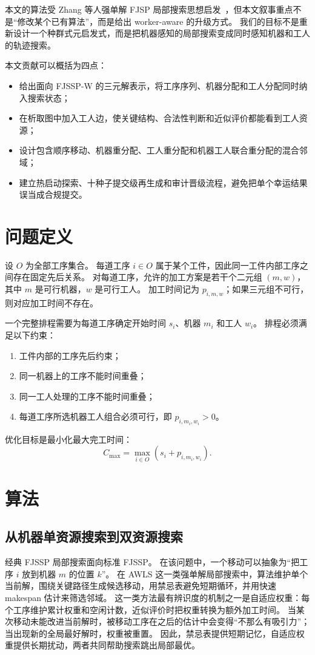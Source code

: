 \documentclass[UTF8,a4paper,zihao=-4]{ctexart}
\begin{document}
本文的算法受 Zhang 等人强单解 FJSP 局部搜索思想启发~\cite{zhang2024awls}，但本文叙事重点不是“修改某个已有算法”，而是给出 worker-aware 的升级方式。
我们的目标不是重新设计一个种群式元启发式，而是把机器感知的局部搜索变成同时感知机器和工人的轨迹搜索。

本文贡献可以概括为四点：
\begin{itemize}
  \item 给出面向 FJSSP-W 的三元解表示，将工序序列、机器分配和工人分配同时纳入搜索状态；
  \item 在析取图中加入工人边，使关键结构、合法性判断和近似评价都能看到工人资源；
  \item 设计包含顺序移动、机器重分配、工人重分配和机器工人联合重分配的混合邻域；
  \item 建立热启动探索、十种子提交级再生成和审计晋级流程，避免把单个幸运结果误当成合规提交。
\end{itemize}

\section{问题定义}
设 $O$ 为全部工序集合。
每道工序 $i\in O$ 属于某个工件，因此同一工件内部工序之间存在固定先后关系。
对每道工序，允许的加工方案是若干个二元组 $(m,w)$，其中 $m$ 是可行机器，$w$ 是可行工人。
加工时间记为 $p_{i,m,w}$；如果三元组不可行，则对应加工时间不存在。

一个完整排程需要为每道工序确定开始时间 $s_i$、机器 $m_i$ 和工人 $w_i$。
排程必须满足以下约束：
\begin{enumerate}
  \item 工件内部的工序先后约束；
  \item 同一机器上的工序不能时间重叠；
  \item 同一工人处理的工序不能时间重叠；
  \item 每道工序所选机器工人组合必须可行，即 $p_{i,m_i,w_i}>0$。
\end{enumerate}
优化目标是最小化最大完工时间：
\[
  C_{\max}=\max_{i\in O}\left(s_i+p_{i,m_i,w_i}\right).
\]

\section{算法}
\subsection{从机器单资源搜索到双资源搜索}
经典 FJSSP 局部搜索面向标准 FJSSP。
在该问题中，一个移动可以抽象为“把工序 $i$ 放到机器 $m$ 的位置 $k$”。
在 AWLS 这一类强单解局部搜索中，算法维护单个当前解，围绕关键路径生成候选移动，用禁忌表避免短期循环，并用快速 makespan 估计来筛选邻域。
这一类方法最有辨识度的机制之一是自适应权重：每个工序维护累计权重和空闲计数，近似评价时把权重转换为额外加工时间。
当某次移动未能改进当前解时，被移动工序在之后的估计中会变得“不那么有吸引力”；当出现新的全局最好解时，权重被重置。
因此，禁忌表提供短期记忆，自适应权重提供长期扰动，两者共同帮助搜索跳出局部最优。
\end{document}
